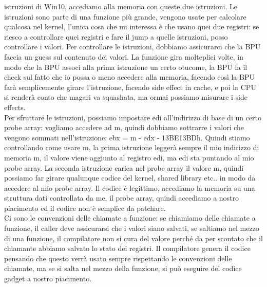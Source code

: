 \documentclass[12pt, oneside]{extbook} %
\begin{document}
istruzioni di Win10, accediamo alla memoria con queste due istruzioni. Le istruzioni sono parte di una funzione più grande, vengono usate per calcolare qualcosa nel kernel, l'unica cosa che mi interessa è che usano quei due registri: se riesco a controllare quei registri e fare il jump a quelle istruzioni, posso controllare i valori. Per controllare le istruzioni, dobbiamo assicurarci che la BPU faccia un guess sul contenuto dei valori. La funzione gira molteplici volte, in modo che la BPU associ alla prima istruzione un certo otucome, la BPU fa il check sul fatto che io possa o meno accedere alla memoria, facendo così la BPU farà semplicemente girare l'istruzione, facendo side effect in cache, e poi la CPU si renderà conto che magari va squashata, ma ormai possiamo misurare i side effects.\\ Per sfruttare le istruzioni, possiamo impostare edi all'indirizzo di base di un certo probe array: vogliamo accedere ad m, quindi dobbiamo sottrarre i valori che vengono sommati nell'istruzione: \textsf{ebx = m - edx - 13BE13BDh}. Quindi stiamo controllando come usare m, la prima istruzione leggerà sempre il mio indirizzo di memoria m, il valore viene aggiunto al registro edi, ma edi sta puntando al mio probe array. La seconda istruzione carica nel probe array il valore m, quindi possiamo far girare qualunque codice del kernel, shared library etc.. in modo da accedere al mio probe array. Il codice è legittimo, accediamo la memoria su una struttura dati controllata da me, il probe array, quindi accediamo a nostro piacimento ed il codice non è semplice da patchare.\\ Ci sono le convenzioni delle chiamate a funzione: se chiamiamo delle chiamate a funzione, il caller deve assicurarsi che i valori siano salvati, se saltiamo nel mezzo di una funzione, il compilatore non si cura del valore perché da per scontato che il chiamante abbiamo salvato lo stato dei registri. Il compilatore genera il codice pensando che questo verrà usato sempre rispettando le convenzioni delle chiamate, ma se si salta nel mezzo della funzione, si può eseguire del codice gadget a nostro piacimento.
\end{document}
